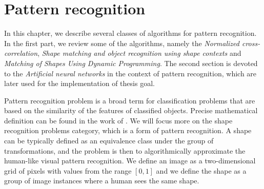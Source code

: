 \chapter{Pattern recognition}
In this chapter, we describe several classes of algorithms for pattern recognition. In the first part, we review some of the algorithms, namely the \emph{Normalized cross-correlation}, \emph{Shape matching and object recognition using shape contexts} and \emph{Matching of Shapes Using Dynamic Programming}. The second section is devoted to the \emph{Artificial neural networks} in the context of pattern recognition, which are later used for the implementation of thesis goal.

Pattern recognition problem is a broad term for classification problems that are based on the similarity of the features of classified objects. Precise mathematical definition can be found in the work of \citet{formalMethods}. We will focus more on the shape recognition problems category, which is a form of pattern recognition. A shape can be typically defined as an equivalence class under the group of transformations, and the problem is then to algorithmically approximate the human-like visual pattern recognition. 
We define an image as a two-dimensional grid of pixels with values from the range $[0,1]$ and we define the shape as a group of image instances where a human sees the same shape.

